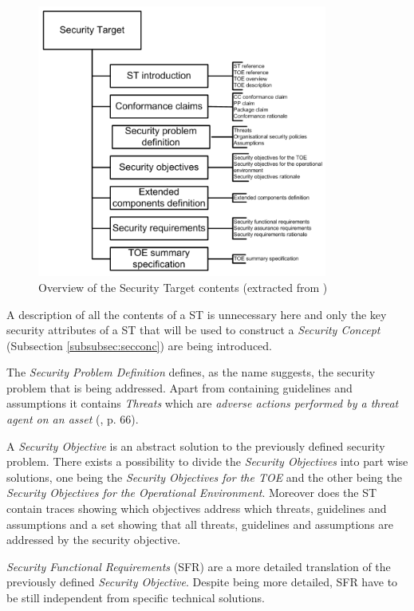 \begin{figure}[H]
\centering
\includegraphics[width=0.85\textwidth]{pictures/sectarget.png}
\caption{Overview of the Security Target contents (extracted from \cite{commoncriteria})}
\label{fig:sectarget}
\end{figure}

A description of all the contents of a ST is unnecessary here and only the key security attributes of a ST that will be used to construct a \textit{Security Concept} (Subsection \ref{subsubsec:secconc}) are being introduced.

The \textit{Security Problem Definition} defines, as the name suggests, the security problem that is being addressed. Apart from containing guidelines and assumptions it contains \textit{Threats} which are \textit{\glqq[...] adverse actions performed by a threat agent on an asset\grqq} (\cite{iso27001}, p. 66).

A \textit{Security Objective} is an abstract solution to the previously defined security problem. There exists a possibility to divide the \textit{Security Objectives} into part wise solutions, one being the \textit{Security Objectives for the TOE} and the other being the \textit{Security Objectives for the Operational Environment}. Moreover does the ST contain traces showing which objectives address which threats, guidelines and assumptions and a set showing that all threats, guidelines and assumptions are addressed by the security objective.

\textit{Security Functional Requirements} (SFR) are a more detailed translation of the previously defined \textit{Security Objective}. Despite being more detailed, SFR have to be still independent from specific technical solutions. 

